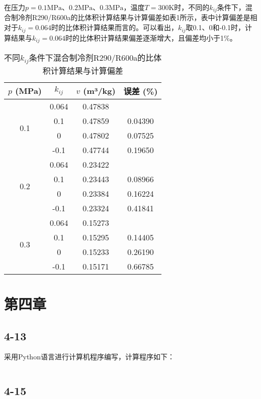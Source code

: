 \documentclass[12pt,a4paper]{article}
\begin{document}
在压力$p=0.1\mathrm{MPa}$、$0.2\mathrm{MPa}$、$0.3\mathrm{MPa}$，温度$T=300\mathrm{K}$时，不同的$k_{ij}$条件下，混合制冷剂R290/R600a的比体积计算结果与计算偏差如表1所示，表中计算偏差是相对于$k_{ij}=0.064$时的比体积计算结果而言的。可以看出，$k_{ij}$取0.1、0和-0.1时，计算结果与$k_{ij}=0.064$时的比体积计算结果偏差逐渐增大，且偏差均小于1\%。
\begin{table}[h]
\centering
\begin{tabular}{c c c c}
\hline
$p$ (MPa) & $k_{ij}$ &  $v$ (m³/kg) &误差 (\%) \\
\hline
\multirow{4}{*}{0.1} & 0.064 & 0.47838 &   \\
 & 0.1 & 0.47859 & 0.04390\\
 & 0 & 0.47802 & 0.07525  \\
 & -0.1 & 0.47744 & 0.19650  \\
\hline
\multirow{4}{*}{0.2} & 0.064 & 0.23422 &   \\
 & 0.1 & 0.23443 & 0.08966  \\
 & 0 & 0.23384 & 0.16224  \\
 & -0.1 & 0.23324 & 0.41841  \\
\hline
\multirow{4}{*}{0.3} & 0.064 & 0.15273 &   \\
 & 0.1 & 0.15295 & 0.14405  \\
 & 0 & 0.15233 & 0.26190  \\
 & -0.1 & 0.15171 & 0.66785  \\
\hline
\end{tabular}
\caption{不同$k_{ij}$条件下混合制冷剂R290/R600a的比体积计算结果与计算偏差}

\end{table}

\newpage

\section*{第四章}

\subsection*{4-13}
采用Python语言进行计算机程序编写，计算程序如下：
\begin{lstlisting}

\end{lstlisting}

\subsection*{4-15}
\end{document}
